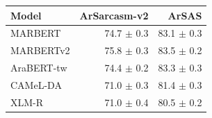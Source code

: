 \begin{tabular}{lrr}
\toprule
Model & ArSarcasm-v2 & ArSAS \\
\midrule
MARBERT & 74.7 $\pm$ 0.3 & 83.1 $\pm$ 0.3 \\
MARBERTv2 & 75.8 $\pm$ 0.3 & 83.5 $\pm$ 0.2 \\
AraBERT-tw & 74.4 $\pm$ 0.2 & 83.3 $\pm$ 0.3 \\
CAMeL-DA & 71.0 $\pm$ 0.3 & 81.4 $\pm$ 0.3 \\
XLM-R & 71.0 $\pm$ 0.4 & 80.5 $\pm$ 0.2 \\
\bottomrule
\end{tabular}
